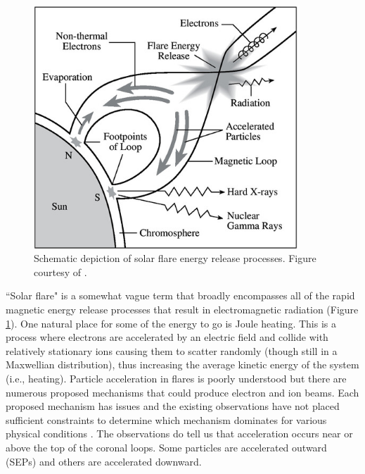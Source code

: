 \begin{figure}[!h]
    \begin{center}
	    \includegraphics[width=100mm]{Images/SolarFlareSchematic.png}
    \end{center}
    \caption[Solar flare schematic]{
        Schematic depiction of solar flare energy release processes. Figure courtesy of \citet{Lang2001}.
    }
    \label{fig:solarflareschematic}
\end{figure}

``Solar flare" is a somewhat vague term that broadly encompasses all of the rapid magnetic energy release processes that result in electromagnetic radiation (Figure \ref{fig:solarflareschematic}). One natural place for some of the energy to go is Joule heating. This is a process where electrons are accelerated by an electric field and collide with relatively stationary ions causing them to scatter randomly (though still in a Maxwellian distribution), thus increasing the average kinetic energy of the system (i.e., heating). Particle acceleration in flares is poorly understood but there are numerous proposed mechanisms that could produce electron and ion beams. Each proposed mechanism has issues and the existing observations have not placed sufficient constraints to determine which mechanism dominates for various physical conditions \citep{Kontar2011, Zharkova2011}. The observations do tell us that acceleration occurs near or above the top of the coronal loops. Some particles are accelerated outward (SEPs) and others are accelerated downward. 

